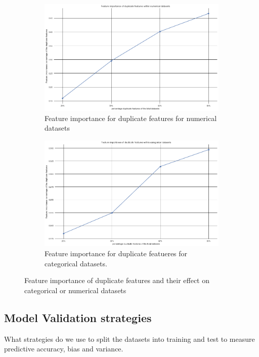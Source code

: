 \documentclass[a4paper,10pt]{article}
\begin{document}
\begin{figure}[H]
	\centering
	\begin{subfigure}[b]{0.45\textwidth}
		\includegraphics[width=\textwidth]{images/MetaFeatures/FeatureImportanceNum.png}
		\caption{Feature importance for duplicate features for numerical datasets}
		\label{fig:FIDN}
	\end{subfigure}
	\begin{subfigure}[b]{0.45\textwidth}
		\includegraphics[width=\textwidth]{images/MetaFeatures/FeatureImportanceCat.png}
		\caption{Feature importance for duplicate featueres for categorical datasets.}
		\label{fig:FIDC}
	\end{subfigure}
	\caption{Feature importance of duplicate features and their effect on categorical or numerical datasets}\label{fig:FID}
\end{figure}

\subsection{Model Validation strategies}
What strategies do we use to split the datasets into training and test to measure predictive accuracy, bias and variance.
\end{document}

